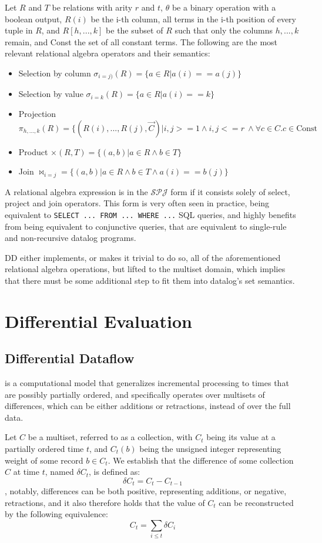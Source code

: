 \documentclass[sigconf,screen,review=false,natbib]{acmart}
\theoremstyle{definition}
\begin{document}
Let $R$ and $T$ be relations with arity $r$ and $t$, $\theta$ be a binary operation with a boolean output, $R(i)$ be
the i-th column, all terms in the i-th position of every tuple in $R$, and $R[h, ..., k]$ be the subset of $R$ such
that only the columns $h, ..., k$ remain, and Const the set of all constant terms. The following are the most
relevant relational algebra operators and their semantics:
\begin{itemize}
	\item Selection by column $\sigma_{i=j)}(R) = \{ a \in R | a(i) == a(j) \}$
	\item Selection by value $\sigma_{i=k}(R) = \{a \in R | a(i) == k \}$
	\item Projection $\pi_{h, ..., k}(R) = \{(R(i), ..., R(j), \overrightarrow{C}) |  i, j >= 1 \wedge i, j <= r\ \wedge \forall c \in C. c \in \text{Const}$
	\item Product $\times(R, T) = \{(a, b) | a \in R \wedge b \in T \}$
	\item Join $\Join_{i=j} = \{(a, b) | a \in R \wedge b \in T \wedge a(i) == b(j)\}$
\end{itemize}
A relational algebra expression is in the $\mathcal{SPJ}$ form if it consists solely of select, project and join
operators. This form is very often seen in practice, being equivalent to \verb|SELECT ... FROM ... WHERE ...| SQL
queries, and highly benefits from being equivalent to conjunctive queries, that are equivalent to single-rule and
non-recursive datalog programs.

DD either implements, or makes it trivial to do so, all of the aforementioned relational algebra
operations, but lifted to the multiset domain, which implies that there must be some additional step to fit them
into datalog's set semantics.

\section{Differential Evaluation}
\subsection{Differential Dataflow} is a computational model that generalizes incremental processing to
times that are possibly partially ordered, and specifically operates over multisets of differences, which
can be either additions or retractions, instead of over the full data.

Let $C$ be a multiset, referred to as a collection, with $C_t$ being its value at a partially ordered
time $t$, and $C_t(b)$ being the unsigned integer representing weight of some record $b \in C_t$. We
establish that the difference of some collection $C$ at time $t$, named $\delta C_t$, is defined as: \[\delta C_t = C_t - C_{t - 1}\],
notably, differences can be both positive, representing additions, or negative, retractions, and it
also therefore holds that the value of $C_t$ can be reconstructed by the following equivalence: \[C_t = \sum_{i \leq t}\delta C_{i}\]
\end{document}
